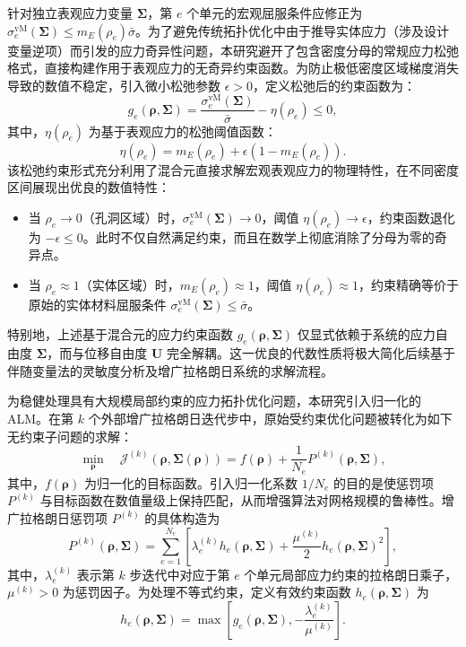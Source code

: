 针对独立表观应力变量 $\boldsymbol{\Sigma}$，第 $e$ 个单元的宏观屈服条件应修正为 $\sigma_e^{\text{vM}}(\boldsymbol{\Sigma}) \le m_E(\rho_e)\bar{\sigma}$。为了避免传统拓扑优化中由于推导实体应力（涉及设计变量逆项）而引发的应力奇异性问题，本研究避开了包含密度分母的常规应力松弛格式，直接构建作用于表观应力的无奇异约束函数。为防止极低密度区域梯度消失导致的数值不稳定，引入微小松弛参数 $\epsilon > 0$，定义松弛后的约束函数为：
\begin{equation}
	g_e(\boldsymbol{\rho}, \boldsymbol{\Sigma}) = \frac{\sigma_e^{\text{vM}}(\boldsymbol{\Sigma})}{\bar{\sigma}} - \eta(\rho_e) \le 0,
	\label{eq:ch5_apparent_stress_constraints}
\end{equation}
其中，$\eta(\rho_e)$ 为基于表观应力的松弛阈值函数：
\[
\eta(\rho_e) = m_E(\rho_e) + \epsilon(1 - m_E(\rho_e)).
\]
该松弛约束形式充分利用了混合元直接求解宏观表观应力的物理特性，在不同密度区间展现出优良的数值特性：
\begin{itemize}
	\item 当 $\rho_e \to 0$（孔洞区域）时，$\sigma_e^{\text{vM}}(\boldsymbol{\Sigma}) \to 0$，阈值 $\eta(\rho_e) \to \epsilon$，约束函数退化为 $-\epsilon \le 0$。此时不仅自然满足约束，而且在数学上彻底消除了分母为零的奇异点。
	
	\item 当 $\rho_e \approx 1$（实体区域）时，$m_E(\rho_e) \approx 1$，阈值 $\eta(\rho_e) \approx 1$，约束精确等价于原始的实体材料屈服条件 $\sigma_e^{\text{vM}}(\boldsymbol{\Sigma}) \le \bar{\sigma}$。
\end{itemize}
特别地，上述基于混合元的应力约束函数 $g_e(\boldsymbol{\rho}, \boldsymbol{\Sigma})$ 仅显式依赖于系统的应力自由度 $\boldsymbol{\Sigma}$，而与位移自由度 $\boldsymbol{U}$ 完全解耦。这一优良的代数性质将极大简化后续基于伴随变量法的灵敏度分析及增广拉格朗日系统的求解流程。

为稳健处理具有大规模局部约束的应力拓扑优化问题，本研究引入归一化的 ALM。在第 $k$ 个外部增广拉格朗日迭代步中，原始受约束优化问题被转化为如下无约束子问题的求解：
\[
\min_{\boldsymbol{\rho}} \quad \mathcal{J}^{(k)}(\boldsymbol{\rho}, \boldsymbol{\Sigma}(\boldsymbol{\rho})) = f(\boldsymbol{\rho}) + \frac{1}{N_e} P^{(k)}(\boldsymbol{\rho}, \boldsymbol{\Sigma}),
\]
其中，$f(\boldsymbol{\rho})$ 为归一化的目标函数。引入归一化系数 $1/N_e$ 的目的是使惩罚项 $P^{(k)}$ 与目标函数在数值量级上保持匹配，从而增强算法对网格规模的鲁棒性。增广拉格朗日惩罚项 $P^{(k)}$ 的具体构造为
\[
P^{(k)}(\boldsymbol{\rho}, \boldsymbol{\Sigma}) = \sum_{e=1}^{N_e} \left[ \lambda_e^{(k)} h_e(\boldsymbol{\rho}, \boldsymbol{\Sigma}) + \frac{\mu^{(k)}}{2} h_e(\boldsymbol{\rho}, \boldsymbol{\Sigma})^2 \right],
\]
其中，$\lambda_e^{(k)}$ 表示第 $k$ 步迭代中对应于第 $e$ 个单元局部应力约束的拉格朗日乘子，$\mu^{(k)} > 0$ 为惩罚因子。为处理不等式约束，定义有效约束函数 $h_e(\boldsymbol{\rho}, \boldsymbol{\Sigma})$ 为
\[
h_e(\boldsymbol{\rho}, \boldsymbol{\Sigma}) = \max \left[ g_e(\boldsymbol{\rho}, \boldsymbol{\Sigma}), -\frac{\lambda_e^{(k)}}{\mu^{(k)}} \right].
\]


